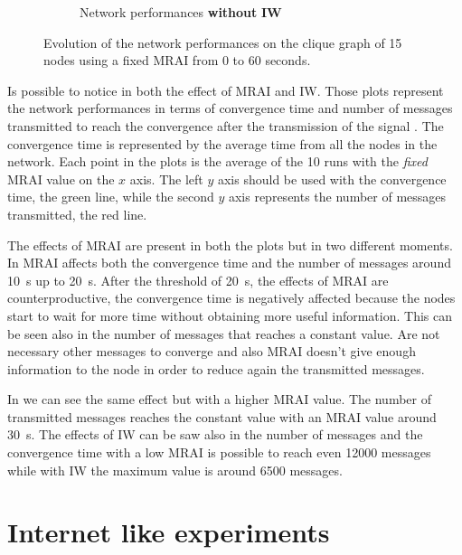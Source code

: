 \begin{figure}[h]
\begin{subfigure}[b]{0.45\textwidth}
		 \caption{Network performances \textbf{without} \textbf{\ac{IW}}}
         \label{fig:clique_evolution_noIW}
     \end{subfigure}
		\caption{Evolution of the network performances on the clique graph of \num{15}
			nodes using a fixed \ac{MRAI} from \num{0} to \num{60} seconds.}
        \label{fig:clique_evolution}
\end{figure}

Is possible to notice in  both the effect of \ac{MRAI}
and \ac{IW}.
Those plots represent the network performances in terms of convergence time and
number of messages transmitted to reach the convergence after the transmission
of the signal .
The convergence time is represented by the average time from all the nodes in the
network.
Each point in the plots is the average of the \num{10} runs with the \textit{fixed}
\ac{MRAI} value on the $x$ axis.
The left $y$ axis should be used with the convergence time, the green line, while
the second $y$ axis represents the number of messages transmitted, the red line.

The effects of \ac{MRAI} are present in both the plots but in two different
moments.
In  \ac{MRAI} affects both the convergence time and
the number of messages around \SI{10}{\second} up to \SI{20}{\second}.
After the threshold of \SI{20}{\second}, the effects of \ac{MRAI} are counterproductive,
the convergence time is negatively affected because the nodes start to wait for more
time without obtaining more useful information.
This can be seen also in the number of messages that reaches a constant value.
Are not necessary other messages to converge and also \ac{MRAI} doesn't give
enough information to the node in order to reduce again the transmitted messages.

In  we can see the same effect but with a higher
\ac{MRAI} value.
The number of transmitted messages reaches the constant value with an \ac{MRAI}
value around \SI{30}{\second}.
The effects of \ac{IW} can be saw also in the number of messages and the convergence
time with a low \ac{MRAI} is possible to reach even \num{12000} messages while
with \ac{IW} the maximum value is around \num{6500} messages.


\section{Internet like experiments}
\label{sec:bgp_mrai_internet_like}


